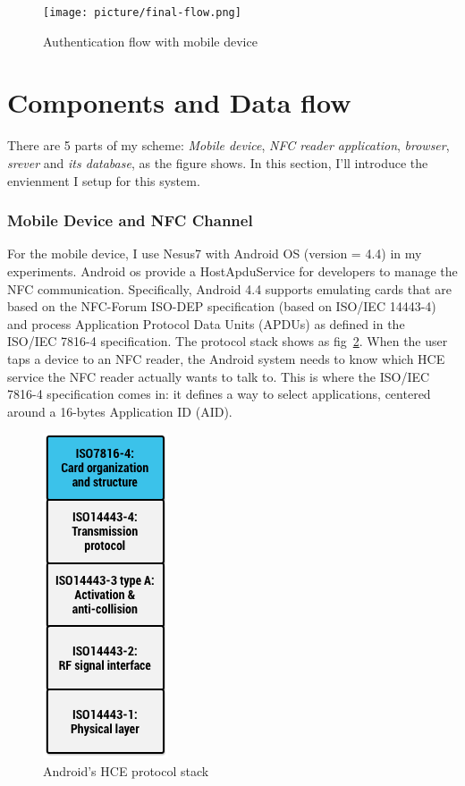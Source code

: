 \begin{CJK}{Bg5}{bsmi}
\begin{figure}
\centering
\texttt{[image: picture/final-flow.png]}
\caption{Authentication flow with mobile device}
\label{fig:final-flow}
\end{figure}

\section{Components and Data flow}

There are 5 parts of my scheme: \emph{Mobile device}, \emph{NFC reader application}, \emph{browser}, \emph{srever} and \emph{its database}, as the figure shows. In this section, I'll introduce the envienment I setup for this system.

\subsubsection{Mobile Device and NFC Channel}

For the mobile device, I use Nesus7 with Android OS (version = 4.4) in my experiments. Android os provide a HostApduService for developers to manage the NFC communication. Specifically, Android 4.4 supports emulating cards that are based on the NFC-Forum ISO-DEP specification (based on ISO/IEC 14443-4) and process Application Protocol Data Units (APDUs) as defined in the ISO/IEC 7816-4 specification. The protocol stack shows as fig~\ref{fig:protocol-stack}. When the user taps a device to an NFC reader, the Android system needs to know which HCE service the NFC reader actually wants to talk to. This is where the ISO/IEC 7816-4 specification comes in: it defines a way to select applications, centered around a 16-bytes Application ID (AID).

\begin{figure}
\centering
\includegraphics[scale=0.7]{picture/protocol-stack.png}
\caption{Android's HCE protocol stack}
\label{fig:protocol-stack}
\end{figure}


\end{CJK}
